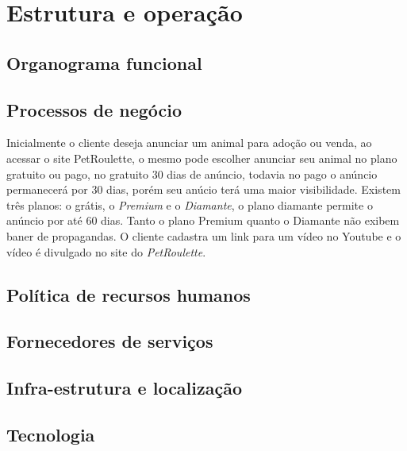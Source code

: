 \chapter{Estrutura e operação} 

\cite{slack2009operations}

\cite{slack2002administração}

\cite{nigel2009operations}

\section{Organograma funcional}

\section{Processos de negócio}
	Inicialmente o cliente deseja anunciar um animal para adoção ou venda, ao acessar o site PetRoulette, o mesmo pode escolher anunciar seu animal no plano gratuito ou pago, no gratuito 30 dias de anúncio, todavia no pago o anúncio permanecerá por 30 dias, porém seu anúcio terá uma maior visibilidade. Existem três planos: o grátis, o \emph{Premium} e o \emph{Diamante}, o plano diamante permite o anúncio por até 60 dias. Tanto o plano Premium quanto o Diamante não exibem baner de propagandas. O cliente cadastra um link para um vídeo no Youtube e o vídeo é divulgado no site do \emph{PetRoulette}.


\section{Política de recursos humanos}

\section{Fornecedores de serviços}

\section{Infra-estrutura e localização}

\section{Tecnologia}
